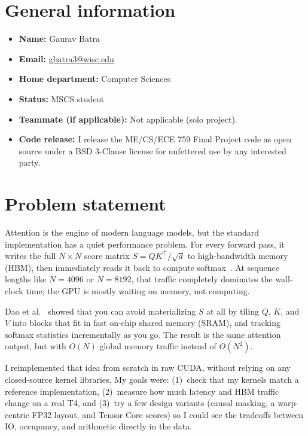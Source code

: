 \documentclass[12pt]{article}
\begin{document}
\section{General information}
\begin{itemize}
    \item \textbf{Name:} Gaurav Batra
    \item \textbf{Email:} \href{mailto:gbatra3@wisc.edu}{gbatra3@wisc.edu}
    \item \textbf{Home department:} Computer Sciences
    \item \textbf{Status:} MSCS student
    \item \textbf{Teammate (if applicable):} Not applicable (solo project).
    \item \textbf{Code release:} I release the ME/CS/ECE 759 Final Project code as open source under a BSD 3-Clause license for unfettered use by any interested party.
\end{itemize}

\section{Problem statement}
\label{sec:problem}

Attention is the engine of modern language models, but the standard implementation has a quiet performance problem. For every forward pass, it writes the full $N{\times}N$ score matrix $S = QK^\top / \sqrt{d}$ to high-bandwidth memory (HBM), then immediately reads it back to compute softmax~\cite{vaswani2017}. At sequence lengths like $N = 4096$ or $N = 8192$, that traffic completely dominates the wall-clock time; the GPU is mostly waiting on memory, not computing.

Dao et al.~\cite{dao2022} showed that you can avoid materializing $S$ at all by tiling $Q$, $K$, and $V$ into blocks that fit in fast on-chip shared memory (SRAM), and tracking softmax statistics incrementally as you go. The result is the same attention output, but with $O(N)$ global memory traffic instead of $O(N^2)$.

I reimplemented that idea from scratch in raw CUDA, without relying on any closed-source kernel libraries. My goals were: (1)~check that my kernels match a reference implementation, (2)~measure how much latency and HBM traffic change on a real T4, and (3)~try a few design variants (causal masking, a warp-centric FP32 layout, and Tensor Core scores) so I could see the tradeoffs between IO, occupancy, and arithmetic directly in the data.
\end{document}
